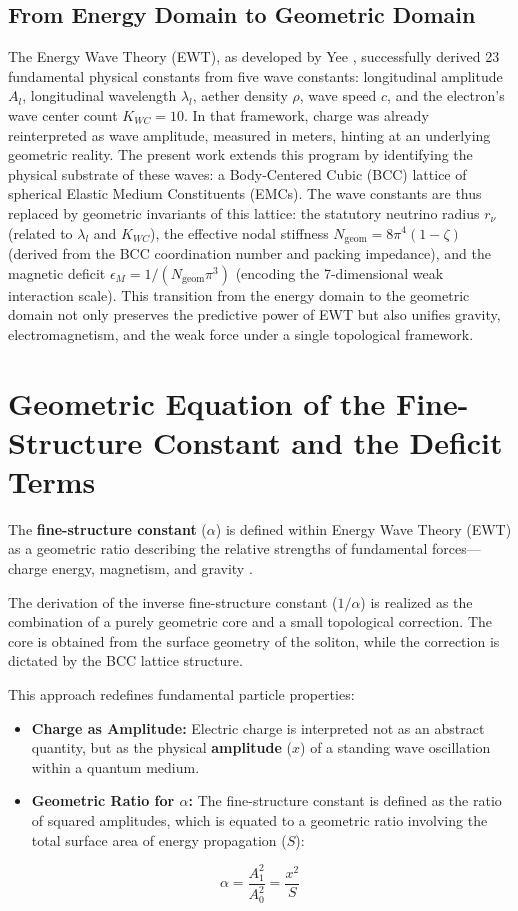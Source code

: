 \documentclass[10pt,a4paper]{article}
\begin{document}
\subsection{From Energy Domain to Geometric Domain}
The Energy Wave Theory (EWT), as developed by Yee \cite{yee2020constants}, successfully derived 23 fundamental physical constants from five wave constants: longitudinal amplitude $A_l$, longitudinal wavelength $\lambda_l$, aether density $\rho$, wave speed $c$, and the electron's wave center count $K_{WC}=10$. In that framework, charge was already reinterpreted as wave amplitude, measured in meters, hinting at an underlying geometric reality. The present work extends this program by identifying the physical substrate of these waves: a Body-Centered Cubic (BCC) lattice of spherical Elastic Medium Constituents (EMCs). The wave constants are thus replaced by geometric invariants of this lattice: the statutory neutrino radius $r_{\nu}$ (related to $\lambda_l$ and $K_{WC}$), the effective nodal stiffness $N_{\text{geom}} = 8\pi^4(1-\zeta)$ (derived from the BCC coordination number and packing impedance), and the magnetic deficit $\epsilon_M = 1/(N_{\text{geom}}\pi^3)$ (encoding the 7-dimensional weak interaction scale). This transition from the energy domain to the geometric domain not only preserves the predictive power of EWT but also unifies gravity, electromagnetism, and the weak force under a single topological framework.

\section{Geometric Equation of the Fine-Structure Constant and the Deficit Terms}
\label{sec:alpha_geometric_deficit}

The \textbf{fine-structure constant} ($\alpha$) is defined within Energy Wave Theory (EWT) as a geometric ratio describing the relative strengths of fundamental forces---charge energy, magnetism, and gravity \cite{Yee2019alfa,yee2025geometriccorrection}.

The derivation of the inverse fine-structure constant ($1/\alpha$) is realized as the combination of a purely geometric core and a small topological correction. The core is obtained from the surface geometry of the soliton, while the correction is dictated by the BCC lattice structure.

This approach redefines fundamental particle properties:
\begin{itemize}
	\item \textbf{Charge as Amplitude:} Electric charge is interpreted not as an abstract quantity, but as the physical \textbf{amplitude} ($x$) of a standing wave oscillation within a quantum medium.
	\item \textbf{Geometric Ratio for $\alpha$:} The fine-structure constant is defined as the ratio of squared amplitudes, which is equated to a geometric ratio involving the total surface area of energy propagation ($S$):
\end{itemize}
\begin{equation}
	\alpha = \frac{A_{1}^{2}}{A_{0}^{2}} = \frac{x^{2}}{S}
\end{equation}
\end{document}

